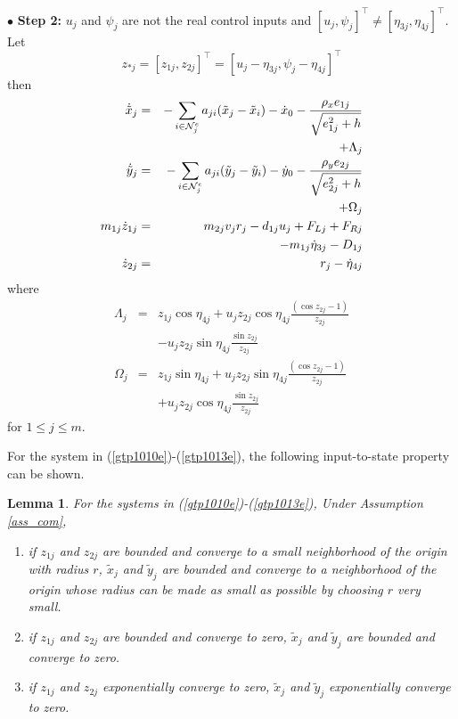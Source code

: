 \documentclass[letterpaper, 10 pt, conference]{ieeeconf}  %
\newtheorem{lemma}{Lemma}
\begin{document}
$\bullet$ {\bf Step 2:} $u_j$ and $\psi_j$ are not the real control
inputs and $[u_j,\psi_j]^\top\not=[\eta_{3j},\eta_{4j}]^\top$. Let
$$z_{*j}=[z_{1j},z_{2j}]^\top=[u_j-\eta_{3j},\psi_j-\eta_{4j}]^\top$$
then
\begin{eqnarray}
\dot{\tilde{x}}_{j}&=&-\sum_{i\in{\cal
N}^e_j}a_{ji}(\tilde{x}_j-\tilde{x}_i)-\dot{x}_0
-\frac{\rho_xe_{1j}}{\sqrt{e^2_{1j}+h}}\nonumber\\
&&+\Lambda_j\label{gtp1010e}\\
\dot{\tilde{y}}_{j}&=&-\sum_{i\in{\cal
N}^e_j}a_{ji}(\tilde{y}_j-\tilde{y}_i)-\dot{y}_0
-\frac{\rho_ye_{2j}}{\sqrt{e^2_{2j}+h}}\nonumber\\
&&+\Omega_j\label{gtp1013e}\\
m_{1j}\dot{z}_{1j}&=&m_{2j}v_jr_j-d_{1j}u_j+F_{Lj}+F_{Rj} \nonumber\\
&&-m_{1j}\dot{\eta}_{3j}-D_{1j}\label{ge35}\\
\dot{z}_{2j}&=&r_j-\dot{\eta}_{4j}\label{ge37}
\end{eqnarray}
where
\begin{eqnarray*}
\Lambda_j&=&z_{1j}\cos\eta_{4j}+u_jz_{2j}\cos\eta_{4j}\frac{(\cos z_{2j}-1)}{z_{2j}}\\
&&-u_jz_{2j}\sin\eta_{4j}\frac{\sin z_{2j}}{z_{2j}}\\
\Omega_j&=&z_{1j}\sin\eta_{4j}+u_jz_{2j}\sin\eta_{4j}\frac{(\cos z_{2j}-1)}{z_{2j}}\\
&&+u_jz_{2j}\cos\eta_{4j}\frac{\sin z_{2j}}{z_{2j}}
\end{eqnarray*}
for $1\leq j\leq m$.

For the system in (\ref{gtp1010e})-(\ref{gtp1013e}), the following
input-to-state property can be shown.
\begin{lemma}
For the systems in (\ref{gtp1010e})-(\ref{gtp1013e}), Under
Assumption \ref{ass_com},
\begin{enumerate}
\item
if $z_{1j}$ and $z_{2j}$ are bounded and converge to a small
neighborhood of the origin with radius $r$, $\tilde{x}_j$ and
$\tilde{y}_j$ are bounded and converge to a neighborhood of the
origin whose radius can be made as small as possible by choosing $r$
very small.
\item
if $z_{1j}$ and $z_{2j}$ are bounded and converge to zero,
$\tilde{x}_j$ and $\tilde{y}_j$ are bounded and converge to zero.
\item if $z_{1j}$ and $z_{2j}$ exponentially converge to
zero, $\tilde{x}_j$ and $\tilde{y}_j$ exponentially converge to
zero. \end{enumerate} \label{lem_int}
\end{lemma}
\end{document}
